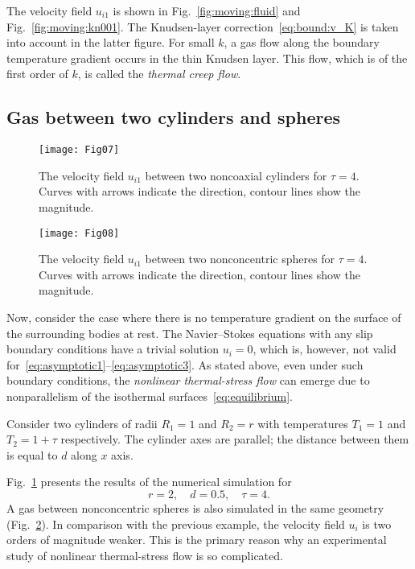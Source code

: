 \documentclass[smallextended, final]{svjour3} %
\begin{document}
The velocity field \(u_{i1}\) is shown in Fig.~\ref{fig:moving:fluid} and Fig.~\ref{fig:moving:kn001}.
The Knudsen-layer correction~\eqref{eq:bound:v_K} is taken into account in the latter figure.
For small \(k\), a gas flow along the boundary temperature gradient occurs
in the thin Knudsen layer. This flow, which is of the first order of \(k\), is called
the \emph{thermal creep flow}.

\subsection{Gas between two cylinders and spheres}

\begin{figure}
    \centering
    \texttt{[image: Fig07]}
    \caption{The velocity field \(u_{i1}\) between two noncoaxial cylinders for \(\tau=4\).
        Curves with arrows indicate the direction, contour lines show the magnitude.}
    \label{fig:cylinders}
\end{figure}

\begin{figure}
    \centering
    \texttt{[image: Fig08]}
    \caption{The velocity field \(u_{i1}\) between two nonconcentric spheres for \(\tau=4\).
        Curves with arrows indicate the direction, contour lines show the magnitude.}
    \label{fig:spheres}
\end{figure}

Now, consider the case where there is no temperature gradient on the surface of the surrounding bodies at rest.
The Navier--Stokes equations with any slip boundary conditions have a trivial solution \(u_i = 0\),
which is, however, not valid for~\eqref{eq:asymptotic1}--\eqref{eq:asymptotic3}.
As stated above, even under such boundary conditions, the \emph{nonlinear thermal-stress flow}
can emerge due to nonparallelism of the isothermal surfaces~\eqref{eq:equilibrium}.

Consider two cylinders of radii \(R_1 = 1\) and \(R_2 = r\)
with temperatures \(T_1 = 1\) and \(T_2 = 1+\tau\) respectively.
The cylinder axes are parallel; the distance between them is equal to \(d\) along \(x\) axis.

Fig.~\ref{fig:cylinders} presents the results of the numerical simulation for
\[ r = 2, \quad d = 0.5, \quad \tau = 4. \]
A gas between nonconcentric spheres is also simulated in the same geometry (Fig.~\ref{fig:spheres}).
In comparison with the previous example, the velocity field \(u_i\) is two orders of magnitude weaker.
This is the primary reason why an experimental study of nonlinear thermal-stress flow is so complicated.
\end{document}
